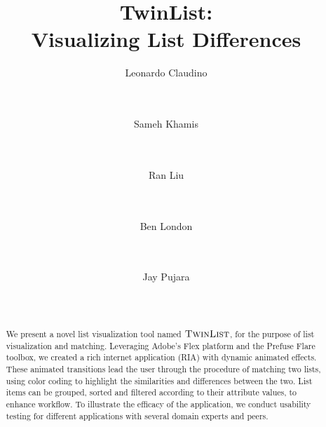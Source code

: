 \documentclass{chi2009}
\newcommand{\TwinList}{\textsc{TwinList}}
\begin{document}
\setlength{\paperheight}{11in}
\setlength{\paperwidth}{8.5in}
\setlength{\pdfpageheight}{\paperheight}
\setlength{\pdfpagewidth}{\paperwidth}


\title{TwinList: \\ Visualizing List Differences}
\author{
  \alignauthor Leonardo Claudino \\
    \\
    \\
  \and
  \alignauthor Sameh Khamis\\
    \\
    \\
  \and
  \alignauthor Ran Liu \\
    \\
    \\
  \and
  \alignauthor Ben London \\
    \\
    \\
  \and
  \alignauthor Jay Pujara \\
    \\
    \\
}

\maketitle

\begin{abstract}
We present a novel list visualization tool named $\TwinList$, for the purpose of list visualization and matching. Leveraging Adobe's Flex platform and the Prefuse Flare toolbox, we created a rich internet application (RIA) with dynamic animated effects. These animated transitions lead the user through the procedure of matching two lists, using color coding to highlight the similarities and differences between the two. List items can be grouped, sorted and filtered according to their attribute values, to enhance workflow. To illustrate the efficacy of the application, we conduct usability testing for different applications with several domain experts and peers.
\end{abstract}
\end{document}
